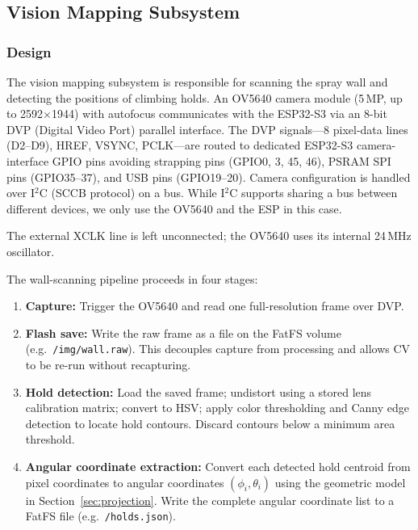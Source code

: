 \documentclass[12pt]{extarticle}
\begin{document}
\subsection{Vision Mapping Subsystem}

\subsubsection{Design}

The vision mapping subsystem is responsible for scanning the spray wall and detecting the
positions of climbing holds. An OV5640 camera module (5\,MP, up to 2592$\times$1944) with
autofocus communicates with the ESP32-S3 via an 8-bit DVP (Digital Video Port) parallel
interface. The DVP signals---8 pixel-data lines (D2--D9), HREF, VSYNC, PCLK---are routed to
dedicated ESP32-S3 camera-interface GPIO pins avoiding strapping pins (GPIO0, 3, 45, 46),
PSRAM SPI pins (GPIO35--37), and USB pins (GPIO19--20). Camera configuration is handled over
I$^2$C (SCCB protocol) on a bus. While I$^2$C supports sharing a bus between different devices,
we only use the OV5640 and the ESP in this case.

The external XCLK line is left unconnected; the
OV5640 uses its internal 24\,MHz oscillator.

The wall-scanning pipeline proceeds in four stages:
\begin{enumerate}
    \item \textbf{Capture:} Trigger the OV5640 and read one full-resolution frame over DVP.
    \item \textbf{Flash save:} Write the raw frame as a file on the FatFS volume (e.g.\
    \texttt{/img/wall.raw}). This decouples capture from processing and allows CV to be
    re-run without recapturing.
    \item \textbf{Hold detection:} Load the saved frame; undistort using a stored lens
    calibration matrix; convert to HSV; apply color thresholding and Canny edge detection to
    locate hold contours. Discard contours below a minimum area threshold.
    \item \textbf{Angular coordinate extraction:} Convert each detected hold centroid from
    pixel coordinates to angular coordinates $(\phi_i, \theta_i)$ using the geometric model
    in Section~\ref{sec:projection}. Write the complete angular coordinate list to a FatFS
    file (e.g.\ \texttt{/holds.json}).
\end{enumerate}
\end{document}
